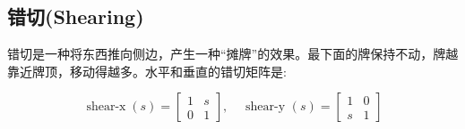 \subsection{错切(Shearing)}

错切是一种将东西推向侧边，产生一种“摊牌”的效果。最下面的牌保持不动，牌越靠近牌顶，移动得越多。水平和垂直的错切矩阵是:

\begin{equation}
	\operatorname{shear-x}(s)=\left[\begin{array}{ll}
		1 & s \\
		0 & 1
	\end{array}\right], \quad \text { shear-y }(s)=\left[\begin{array}{ll}
		1 & 0 \\
		s & 1
	\end{array}\right]
\nonumber
\end{equation}

